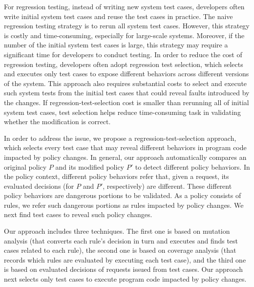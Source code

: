For regression testing, instead of writing new system test cases, developers often write initial system test cases and 
reuse the test cases in practice. The naive regression testing strategy is to rerun all system test cases. However,
 this strategy is costly and time-consuming, especially for large-scale systems. Moreover, if the number of the initial 
system test cases is large, this strategy may require a significant time for developers to conduct testing. In order to
 reduce the cost of regression testing, developers often adopt regression test selection, which selects and executes only
 test cases to expose different behaviors across different versions of the system. This approach also requires substantial
 costs to select and execute such system tests from the initial test cases that could reveal faults introduced by the changes. 
If regression-test-selection cost is smaller than rerunning all of initial system test cases, test selection helps reduce 
time-consuming task in validating whether the modification is correct. 

In order to address the issue, we propose a regression-test-selection approach, which selects every test case that may 
reveal different behaviors in program code impacted by policy changes.
In general, our approach automatically compares an original 
policy $P$ and its modified policy $P'$ to detect different policy behaviors. In the policy context, different policy 
behaviors refer that, given a request, its evaluated decisions (for $P$ and $P'$, respectively) are different.
These different policy behaviors are dangerous portions to be validated. As a policy consists of rules, we refer such dangerous portions as rules impacted by policy changes. 
We next find test cases to reveal such policy changes.



Our approach includes three techniques.
The first one is based on mutation analysis (that converts each rule's decision in turn and executes 
and finds test cases related to each rule), the second one is based on coverage analysis (that records 
which rules are evaluated by executing each test case), and the third one is based on evaluated 
decisions of requests issued from test cases. Our approach next selects only test cases to execute program code impacted by policy changes.

